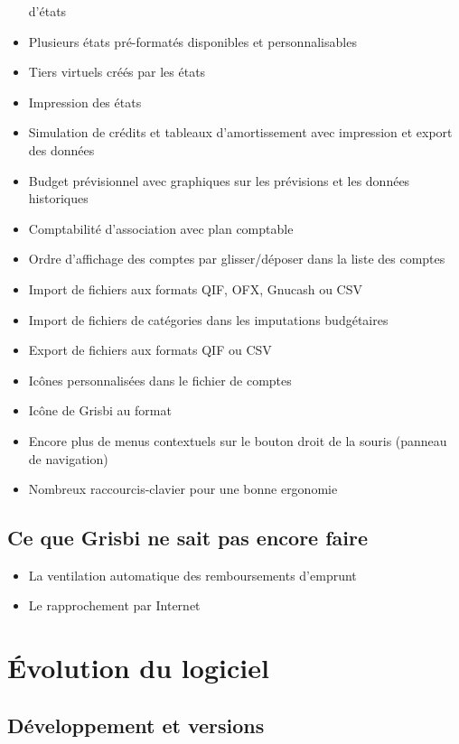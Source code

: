 \begin{itemize}
	d'états
	\item Plusieurs états pré-formatés disponibles et personnalisables
	\item Tiers virtuels créés par les états
	\item Impression des états
	\item Simulation de crédits et tableaux d'amortissement avec impression et export des données
	\item Budget prévisionnel avec graphiques sur les prévisions et les données historiques
	\item Comptabilité d'association avec plan comptable
	\item Ordre d'affichage des comptes par glisser/déposer dans la liste des comptes
	\item Import de fichiers aux formats \gls{QIF}, \gls{OFX}, \gls{Gnucash} ou \gls{CSV}
	\item Import de fichiers de catégories dans les imputations budgétaires
	\item Export de fichiers aux formats \gls{QIF} ou \gls{CSV}
	\item Icônes personnalisées dans le fichier de comptes
	\item Icône de Grisbi au format 
	\item Encore plus de menus contextuels sur le bouton droit de la souris (panneau de navigation)
	\item Nombreux raccourcis-clavier pour une bonne ergonomie
\end{itemize}


\subsection{Ce que Grisbi ne sait pas encore faire}

\begin{itemize}
	\item La ventilation automatique des remboursements d'emprunt
	\item Le rapprochement par Internet
\end{itemize}


\section{Évolution du logiciel}


\subsection{Développement et versions}

